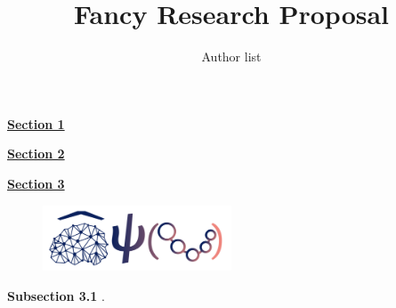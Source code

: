 \documentclass{proposal}
\title{Fancy Research Proposal}
\author{Author list}
\date{}
\begin{document}
\justifying
\textbf{\underline{Section 1}} 
\lipsum[1] \cite{Beris1994}

\textbf{\underline{Section 2}} 
\lipsum[2-3] \cite{deGennes}

\textbf{\underline{Section 3}} 
\begin{figure}
    \vspace{-2\baselineskip}  %
    \includegraphics[width=0.5\textwidth]{fig/JacksonLabLogo.png}
    \vspace{-1.8\baselineskip}    %
\end{figure}
\lipsum[3-5]

\textbf{Subsection 3.1}
\textit{\lipsum[1]}\cite{Palacio_2025}.

\lipsum[5-8]



\end{document}
